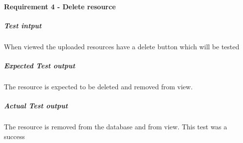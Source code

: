 \paragraph{Requirement 4 - Delete resource}
	\subparagraph{Test intput}
	When viewed the uploaded resources have a delete button which will be tested
	\subparagraph{Expected Test output}
	The resource is expected to be deleted and removed from view.
	\subparagraph{Actual Test output}
	The resource is removed from the database and from view. This test was a success 
